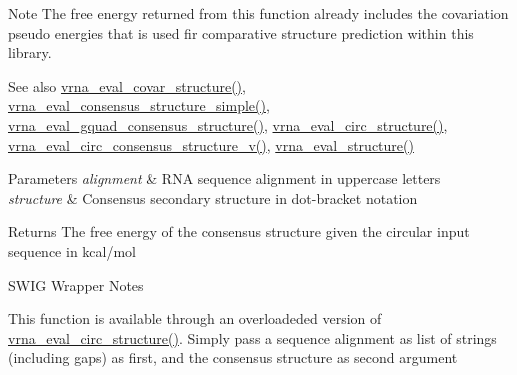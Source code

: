 \begin{DoxyNote}{Note}
The free energy returned from this function already includes the covariation pseudo energies that is used fir comparative structure prediction within this library.
\end{DoxyNote}
\begin{DoxySeeAlso}{See also}
\hyperlink{group__eval_ga6cea75c0eb9857fb59172be54cab09e0}{vrna\+\_\+eval\+\_\+covar\+\_\+structure()}, \hyperlink{group__eval_ga7762c3a7bdcbc3a14ef93259d322c7d6}{vrna\+\_\+eval\+\_\+consensus\+\_\+structure\+\_\+simple()}, \hyperlink{group__eval_gaf09a326b3d57a4b30c27bd0e216198ac}{vrna\+\_\+eval\+\_\+gquad\+\_\+consensus\+\_\+structure()}, \hyperlink{group__eval_ga3e05a23ddf9b083f4e69881e440d4866}{vrna\+\_\+eval\+\_\+circ\+\_\+structure()}, \hyperlink{group__eval_gae89240c230e4740b22a703ee953396b9}{vrna\+\_\+eval\+\_\+circ\+\_\+consensus\+\_\+structure\+\_\+v()}, \hyperlink{group__eval_ga58f199f1438d794a265f3b27fc8ea631}{vrna\+\_\+eval\+\_\+structure()}
\end{DoxySeeAlso}

\begin{DoxyParams}{Parameters}
{\em alignment} & R\+NA sequence alignment in uppercase letters \\
\hline
{\em structure} & Consensus secondary structure in dot-\/bracket notation \\
\hline
\end{DoxyParams}
\begin{DoxyReturn}{Returns}
The free energy of the consensus structure given the circular input sequence in kcal/mol
\end{DoxyReturn}
\begin{DoxyRefDesc}{S\+W\+I\+G Wrapper Notes}
\item[\hyperlink{wrappers__wrappers000040}{S\+W\+I\+G Wrapper Notes}]This function is available through an overloadeded version of \hyperlink{group__eval_ga3e05a23ddf9b083f4e69881e440d4866}{vrna\+\_\+eval\+\_\+circ\+\_\+structure()}. Simply pass a sequence alignment as list of strings (including gaps) as first, and the consensus structure as second argument \end{DoxyRefDesc}
\mbox{\label{group__eval_gaf09a326b3d57a4b30c27bd0e216198ac}} 
